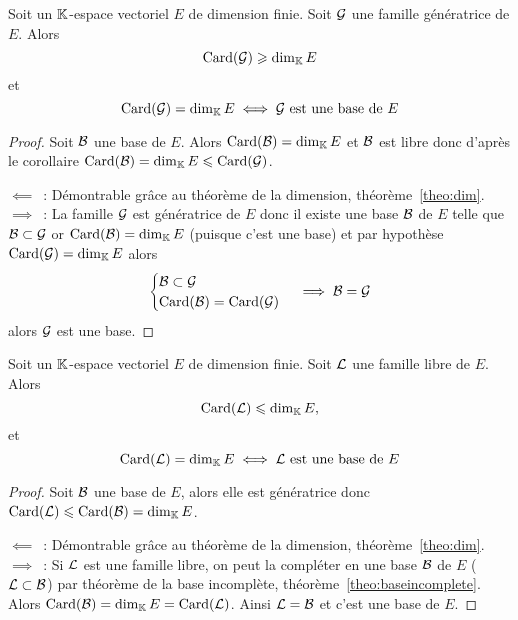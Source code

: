 \begin{theo}
  Soit un \(\mathbb{K}\)-espace vectoriel \(E\) de dimension finie. Soit \(\mathcal{G}\) une famille génératrice de \(E\). Alors
  \begin{equation}
    \operatorname{Card}(\mathcal{G}) \geqslant \operatorname{dim}_{\mathbb{K}} E
  \end{equation}
et
\begin{equation}
  \operatorname{Card}(\mathcal{G})=\operatorname{dim}_{\mathbb{K}} E \iff \mathcal{G} \text{~est une base de } E
\end{equation}
\end{theo}
\begin{proof}
  Soit \(\mathcal{B}\) une base de \(E\). Alors \(\operatorname{Card}(\mathcal{B})=\operatorname{dim}_{\mathbb{K}} E\) et \(\mathcal{B}\) est libre donc d'après le corollaire \(\operatorname{Card}(\mathcal{B}) = \operatorname{dim}_{\mathbb{K}} E \leqslant \operatorname{Card}(\mathcal{G})\).

  \(\impliedby\)~: Démontrable grâce au théorème de la dimension, théorème~\ref{theo:dim}.
  \(\implies\)~: La famille \(\mathcal{G}\) est génératrice de \(E\) donc il existe une base \(\mathcal{B}\) de \(E\) telle que \(\mathcal{B} \subset \mathcal{G}\) or \(\operatorname{Card}(\mathcal{B}) = \operatorname{dim}_{\mathbb{K}} E\) (puisque c'est une base) et par hypothèse \(\operatorname{Card}(\mathcal{G}) = \operatorname{dim}_{\mathbb{K}} E\) alors
  \begin{equation}
    \begin{cases} \mathcal{B} \subset \mathcal{G} \\ \operatorname{Card}(\mathcal{B}) = \operatorname{Card}(\mathcal{G}) \end{cases} \implies \mathcal{B}=\mathcal{G}
  \end{equation}
  alors \(\mathcal{G}\) est une base.
\end{proof}

\begin{theo}
  Soit un \(\mathbb{K}\)-espace vectoriel \(E\) de dimension finie. Soit \(\mathcal{L}\) une famille libre de \(E\). Alors
  \begin{equation}
    \operatorname{Card}(\mathcal{L}) \leqslant \operatorname{dim}_{\mathbb{K}} E,
  \end{equation}
  et
  \begin{equation}
    \operatorname{Card}(\mathcal{L})=\operatorname{dim}_{\mathbb{K}} E \iff \mathcal{L} \text{~est une base de } E
  \end{equation}
\end{theo}
\begin{proof}
  Soit \(\mathcal{B}\) une base de \(E\), alors elle est génératrice donc \(\operatorname{Card}(\mathcal{L}) \leqslant \operatorname{Card}(\mathcal{B})=\operatorname{dim}_{\mathbb{K}} E\).

  \(\impliedby\)~: Démontrable grâce au théorème de la dimension, théorème~\ref{theo:dim}.  
  \(\implies\)~: Si \(\mathcal{L}\) est une famille libre, on peut la compléter en une base \(\mathcal{B}\) de \(E\) (\(\mathcal{L} \subset \mathcal{B}\)) par théorème de la base incomplète, théorème~\ref{theo:baseincomplete}. Alors \(\operatorname{Card}(\mathcal{B})=\operatorname{dim}_{\mathbb{K}} E = \operatorname{Card}(\mathcal{L})\). Ainsi \(\mathcal{L}=\mathcal{B}\) et c'est une base de \(E\).
\end{proof}

